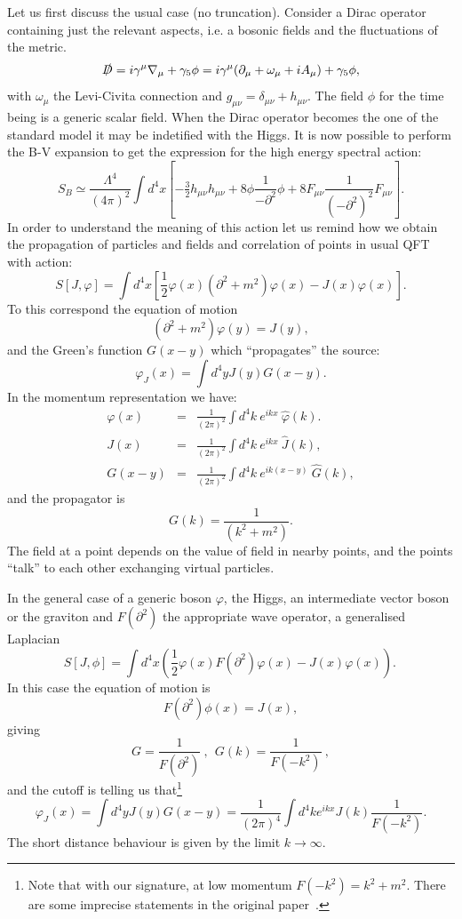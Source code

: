 \documentclass[12pt,a4paper]{article}
\newcommand{\be}{\begin{equation}}
\newcommand{\ee}{\end{equation}}
\newcommand{\bea}{\begin{eqnarray}}
\newcommand{\eea}{\end{eqnarray}}
\newcommand{\del}{\partial}
\newcommand{\formula}[1]{\be #1 \ee}
\newcommand{\formu}[1]{$  #1$}
\begin{document}
Let us first discuss the usual case (no truncation). Consider a Dirac operator containing just the relevant aspects, i.e. a bosonic fields and the fluctuations of the metric.
\formula{
\slashed{D}=i\gamma^\mu \nabla_\mu + \gamma_5 \phi= i\gamma^\mu (\del_\mu+\omega_\mu + iA_
\mu) +\gamma_5 \phi,\label{sD}}
with \formu{\omega_\mu} the Levi-Civita connection and  \formu{g_{\mu\nu}=\delta_{\mu\nu}+h_{\mu\nu}}. The field $\phi$ for the time being is a generic scalar field. When the Dirac operator becomes the one of the standard model it may be indetified with the Higgs. It is now possible to perform the B-V expansion to get the expression for the high energy spectral action:
\formula{ 
S_B\simeq  
\frac {\Lambda^4}{(4\pi )^2} \int d^4x \left[ -\tfrac 32  h_{\mu\nu}h_{\mu\nu}
+8 \phi \frac 1{-\partial^2} \phi + 8 F_{\mu\nu} \frac 1{(-\partial^2)^2} F_{\mu\nu} \right] .}
In order to understand the meaning of this action let us remind how we obtain the propagation of particles and fields and correlation of points in usual QFT with action:
\formula{
S[J,\varphi] = \int d^4 x \left[\frac12\varphi(x)\left(\partial^2 + m^2 \right)\varphi(x)  - J(x)\varphi(x) \right].}
To this correspond the equation of motion
\formula{
\left(\partial^2 + m^2 \right)\varphi(y)  = J(y),}
and the Green's function \formu{G(x-y)} which ``propagates'' the source: 
\formula{
\varphi_J(x)=\int d^4y J(y) G(x-y).}
In the momentum representation we have:
\bea
\varphi(x) &=&  \frac{1}{\left(2\pi\right)^2} \int d^4 k ~e^{ikx} ~ \hat{\varphi}(k). \nonumber\\
J(x) &=& \frac{1}{\left(2\pi\right)^2} \int d^4 k ~e^{ikx} ~ \hat{J}(k),\nonumber\\
G(x-y) &=& \frac{1}{\left(2\pi\right)^2} \int d^4 k ~e^{ik(x-y)} ~ \hat{G}(k),
\eea
and the propagator is
\formula{G(k) = \frac1{\left(k^2+m^2\right)}.}
The field at a point depends on the value of field in nearby points, and the points ``talk'' to each other exchanging virtual particles.




In the general case of a generic boson \formu{\varphi}, the Higgs, an intermediate vector boson or the graviton and \formu{F(\del^2)} the appropriate wave operator, a generalised Laplacian
\formula{
S[J,\phi]=\int d^4x \left(\frac12 \varphi(x) F(\del^2) \varphi(x) -J(x) \varphi(x)\right).\,}
In this case the equation of motion is
\be
F(\del^2)\phi(x)=J(x)\label{eom},
\ee
giving
\formula{
G=\frac1{F(\del^2)}\ , \ \ G(k)=\frac1{F(-k^2)}\ , }
and
the cutoff is telling us that\footnote{Note that with our signature, at low momentum $F(-k^2)=k^2+m^2$. There are some imprecise statements in the original paper~\cite{Kuliva}.}
\formula{
\varphi_J(x)=\int d^4y J(y) G(x-y)=\frac1{(2\pi)^4}\int d^4k e^{ikx}J(k)\frac1{F(-k^2)} .}
The short distance behaviour is given by the limit \formu{k\to\infty}.
\end{document}
